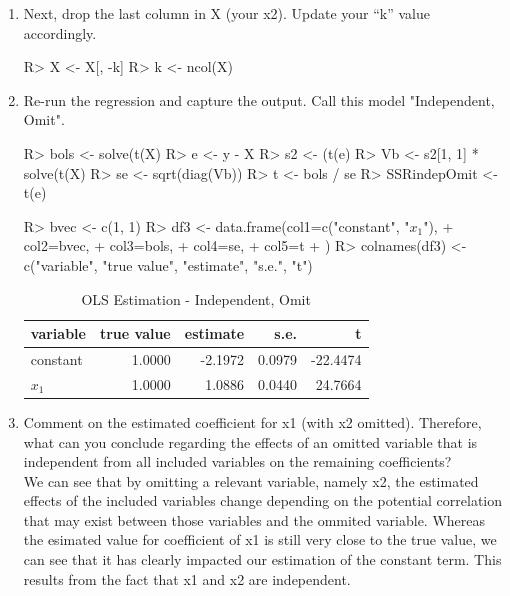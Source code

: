 \documentclass[11pt,reqno]{article}   %
\begin{document}
\begin{enumerate}
\item
Next, drop the last column in X (your x2).
Update your ``k'' value accordingly.

\begin{Schunk}
\begin{Sinput}
R> X <- X[, -k]
R> k <- ncol(X)
\end{Sinput}
\end{Schunk}

\item
Re-run the regression and capture the output. Call this model "Independent, Omit".
\begin{Schunk}
\begin{Sinput}
R> bols <- solve(t(X) %
R> e <- y - X %
R> s2 <- (t(e) %
R> Vb <- s2[1, 1] * solve(t(X) %
R> se <- sqrt(diag(Vb))
R> t <- bols / se
R> SSRindepOmit <- t(e) %
\end{Sinput}
\end{Schunk}
\begin{Schunk}
\begin{Sinput}
R> bvec <- c(1, 1)
R> df3 <- data.frame(col1=c("constant", "$x_1$"),
+                  col2=bvec,
+                  col3=bols,
+                  col4=se,
+                  col5=t
+                  )
R> colnames(df3) <- c("variable", "true value", "estimate", "s.e.", "t")
\end{Sinput}
\end{Schunk}

\begin{table}[!h]
\centering
\caption{OLS Estimation - Independent, Omit} 
\begin{tabular}{lrrrr}
  \hline
variable & true value & estimate & s.e. & t \\ 
  \hline
constant & 1.0000 & -2.1972 & 0.0979 & -22.4474 \\ 
  $x_1$ & 1.0000 & 1.0886 & 0.0440 & 24.7664 \\ 
   \hline
\end{tabular}
\end{table}\item
Comment on the estimated coefficient for x1 (with x2 omitted).
Therefore, what can you conclude regarding the effects of an omitted variable that is independent from all included variables on the remaining coefficients?\\

We can see that by omitting a relevant variable, namely x2, the estimated effects of the included variables change depending on the potential correlation that may exist between those variables and the ommited variable. Whereas the esimated value for coefficient of x1 is still very close to the true value, we can see that it has clearly impacted our estimation of the constant term. This results from the fact that x1 and x2 are independent.
\end{enumerate}
\end{document}
